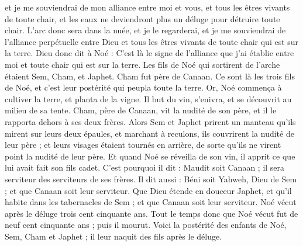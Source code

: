 \begin{multicols}{2}
et je me souviendrai de mon alliance entre moi et vous, et tous les êtres vivants de toute chair, et les eaux ne deviendront plus un déluge pour détruire toute chair.
L'arc donc sera dans la nuée, et je le regarderai, et je me souviendrai de l'alliance perpétuelle entre Dieu et tous les êtres vivants  de toute chair qui est sur la terre.
Dieu donc dit à Noé : C'est là le signe de l'alliance que j'ai établie entre moi et toute chair qui est sur la terre.
Les fils de Noé qui sortirent de l'arche étaient Sem, Cham, et Japhet. Cham fut père de Canaan.
Ce sont là les trois fils de Noé, et c’est leur postérité qui peupla toute la terre.
Or, Noé commença à cultiver la terre, et planta de la vigne.
Il but du vin, s'enivra, et se découvrit au milieu de sa tente.
Cham, père de Canaan, vit la nudité de son père, et il le rapporta dehors à ses deux frères.
Alors Sem et Japhet prirent un manteau qu'ils mirent sur leurs deux épaules, et marchant à reculons, ils couvrirent la nudité de leur père ; et leurs visages étaient tournés en arrière, de sorte qu'ils ne virent point la nudité de leur père.
Et quand Noé se réveilla de son vin, il apprit ce que lui avait fait son fils cadet.
C'est pourquoi il dit : Maudit soit Canaan ; il sera serviteur des serviteurs de ses frères.
Il dit aussi : Béni soit Yahweh, Dieu de Sem ; et que Canaan soit leur serviteur.
Que Dieu étende en douceur Japhet, et qu’il habite dans les tabernacles de Sem ; et que Canaan soit leur serviteur.
Noé vécut après le déluge trois cent cinquante ans.
Tout le temps donc que Noé vécut fut de neuf cent cinquante ans ; puis il mourut.
\VerseOne{}Voici la postérité des enfants de Noé, Sem, Cham et Japhet ; il leur naquit des fils après le déluge.

\end{multicols}
